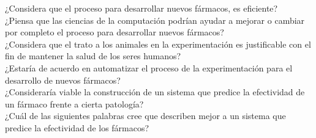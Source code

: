 \noindent ¿Considera que el proceso para desarrollar nuevos fármacos, es eficiente?\\

\noindent ¿Piensa que las ciencias de la computación podrían ayudar a mejorar o cambiar por completo el proceso para desarrollar nuevos fármacos?\\

\noindent ¿Considera que el trato a los animales en la experimentación es justificable con el fin de mantener la salud de los seres humanos?\\

\noindent ¿Estaría de acuerdo en automatizar el proceso de la experimentación para el desarrollo de nuevos fármacos?\\

\noindent ¿Consideraría viable la construcción de un sistema que predice la efectividad de un fármaco frente a cierta patología?\\

\noindent ¿Cuál de las siguientes palabras cree que describen mejor a un sistema que predice la efectividad de los fármacos?\\



